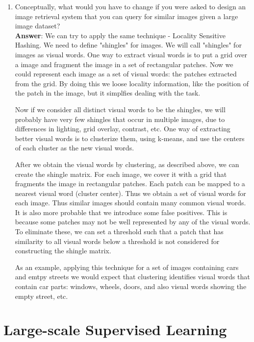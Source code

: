 \documentclass[11pt]{article}
\begin{document}
\begin{enumerate}
\item Conceptually, what would you have to change if you were asked to design
an image retrieval system that you can query for similar images given a large
image dataset? \\

\textbf{Answer}:
We can try to apply the same technique - Locality Sensitive Hashing. We need to
define "shingles" for images. We will call "shingles" for images as visual
words. One way to extract visual words is to put a grid over a image and
fragment the image in a set of rectangular patches. Now we could represent each
image as a set of visual words: the patches extracted from the grid. By doing
this we loose locality information, like the position of the patch in the
image, but it simplfies dealing with the task.

Now if we consider all distinct visual words to be the shingles, we will
probably have very few shingles that occur in multiple images, due to
differences in lighting, grid overlay, contrast, etc. One way of extracting
better visual words is to clusterize them, using k-means, and use the centers
of each cluster as the new visual words. 

After we obtain the visual words by clustering, as described above, we can
create the shingle matrix. For each image, we cover it with a grid that
fragments the image in rectangular patches. Each patch can be mapped to a
nearest visual word (cluster center). Thus we obtain a set of visual words for
each image. Thus similar images should contain many common visual words. It is
also more probable that we introduce some false positives. This is because some
patches may not be well represented by any of the visual words. To eliminate
these, we can set a threshold such that a patch that has similarity to all
visual words below a threshold is not considered for constructing the shingle
matrix.

As an example, applying this technique for a set of images containing cars and
emtpy streets we would expect that clustering identifies visual words that
contain car parts: windows, wheels, doors, and also visual words showing the
empty street, etc.

\end{enumerate}

\section{Large-scale Supervised Learning}
\end{document}
